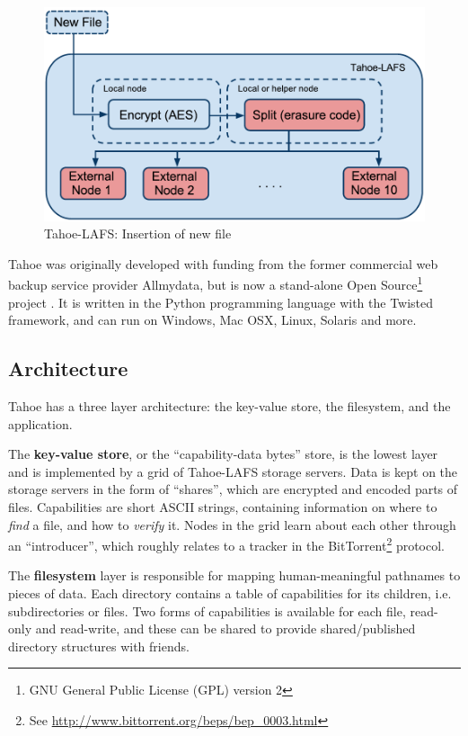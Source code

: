 \documentclass[english,12pt,a4paper]{book}
\begin{document}
\begin{figure}[h!]
    \centering
    \includegraphics[width=0.9\columnwidth]{Tahoe-newfile.pdf}
    \caption{Tahoe-LAFS: Insertion of new file}
    \label{fig:tahoeinsertion}
\end{figure}

Tahoe was originally developed with funding from the former commercial web
backup service provider Allmydata, but is now a stand-alone Open
Source\footnote{GNU General Public License (GPL) version 2} project
\cite{t_ars}.  It is written in the Python programming language with the Twisted
framework, and can run on Windows, Mac OSX, Linux, Solaris and more.

\subsection{Architecture}

Tahoe has a three layer architecture: the key-value store, the filesystem, and
the application.

The \textbf{key-value store}, or the ``capability-data bytes'' store, is the
lowest layer and is implemented by a grid of Tahoe-LAFS storage servers. Data is
kept on the storage servers in the form of ``shares'', which are encrypted and
encoded parts of files. Capabilities are short ASCII strings, containing
information on where to \emph{find} a file, and how to \emph{verify} it.
Nodes in the grid learn about each other through an ``introducer'', which
roughly relates to a tracker in the BitTorrent\footnote{See
\url{http://www.bittorrent.org/beps/bep\_0003.html}} protocol.

The \textbf{filesystem} layer is responsible for mapping human-meaningful
pathnames to pieces of data. Each directory contains a table of capabilities
for its children, i.e. subdirectories or files. Two forms of capabilities is
available for each file, read-only and read-write, and these can be shared to
provide shared/published directory structures with friends.
\end{document}
